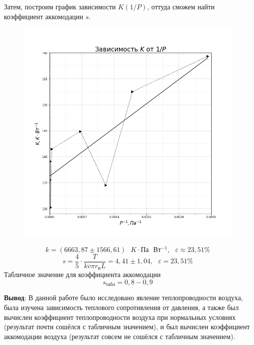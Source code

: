 \documentclass[a4paper,12pt]{article}
\begin{document}
Затем, построим график зависимости $K(1/P)$, оттуда сможем найти коэффициент аккомодации $s$.
\begin{figure}[H]\label{fig:K(1/P)}
    \centering
    \includegraphics[width = \textwidth]{K_P-1.png}
\end{figure}
\[k = (6663,87 \pm 1566,61) \text{ }K\cdot Па \text{ }Вт^{-1}, \text{ }\varepsilon \approx 23,51\%\]
\[s = \frac{4}{5}\cdot \frac{T}{k \overline{v}\pi r_н L} = 4,41 \pm 1,04, \text{ }\varepsilon = 23,51\%\]
Табличное значение для коэффициента аккомодации
\[s_{табл} = 0,8 - 0,9\]


\textbf{Вывод}: В данной работе было исследовано явление теплопроводности воздуха, была изучена зависимость теплового сопротивления от давления, а также был вычислен коэффициент теплопроводности воздуха при нормальных условиях (результат почти сошёлся с табличным значением), и был вычислен коэффициент аккомодации воздуха (результат совсем не сошёлся с табличным значением).
\end{document}
